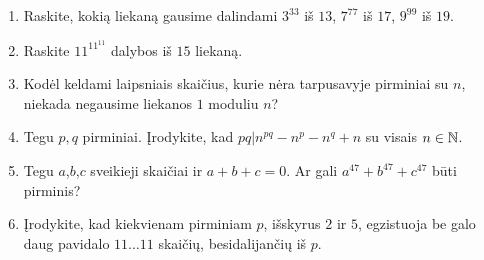 \begin{enumerate}
  \item Raskite, kokią liekaną gausime dalindami $3^{33}$  iš $13$, $7^{77}$
    iš $17$, $9^{99}$ iš $19$. 
  \item Raskite $11^{11^{11}}$ dalybos iš $15$ liekaną. 
  \item Kodėl keldami laipsniais skaičius, kurie nėra tarpusavyje pirminiai su
    $n$, niekada negausime liekanos $1$ moduliu $n$?
 \item Tegu $p,q$ pirminiai. Įrodykite, kad $pq|n^{pq} - n^{p} -
    n^{q} + n$ su visais $n\in \mathbb N$.
  \item Tegu $a$,$b$,$c$ sveikieji skaičiai ir $a+b+c=0$. Ar gali
    $a^{47}+b^{47}+c^{47}$ būti pirminis?
  \item Įrodykite, kad kiekvienam pirminiam $p$, išskyrus $2$ ir $5$,
    egzistuoja be galo daug pavidalo $11\dots11$ skaičių, besidalijančių iš
    $p$.

\end{enumerate}
